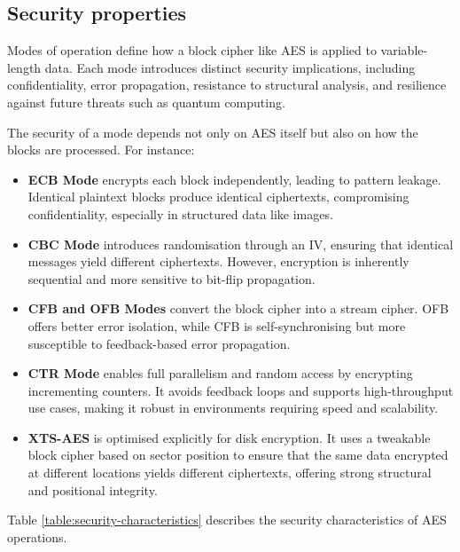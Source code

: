 \subsection{Security properties}

Modes of operation define how a block cipher like AES is applied to variable-length data. 
Each mode introduces distinct security implications, 
including confidentiality, error propagation, resistance to structural analysis, 
and resilience against future threats such as quantum computing.

The security of a mode depends not only on AES itself but also on how the blocks are processed. 
For instance:

\begin{itemize}
    \item \textbf{\Gls{ECB} Mode} encrypts each block independently, leading to pattern leakage. 
    Identical plaintext blocks produce identical ciphertexts, compromising confidentiality, especially in structured data like images.
    
    \item \textbf{\Gls{CBC} Mode} introduces randomisation through an \Gls{IV}, ensuring that identical messages yield different ciphertexts. 
    However, encryption is inherently sequential and more sensitive to bit-flip propagation.
    
    \item \textbf{\Gls{CFB} and \Gls{OFB} Modes} convert the block cipher into a stream cipher. 
    \Gls{OFB} offers better error isolation, while \gls{CFB} is self-synchronising but more susceptible to feedback-based error propagation.
    
    \item \textbf{\Gls{CTR} Mode} enables full parallelism and random access by encrypting incrementing counters. 
    It avoids feedback loops and supports high-throughput use cases, making it robust in environments requiring speed and scalability.
    
    \item \textbf{\Gls{XTS}-AES} is optimised explicitly for disk encryption. 
    It uses a tweakable block cipher based on sector position to ensure that the same data encrypted at different locations yields different ciphertexts, offering strong structural and positional integrity.
\end{itemize}

Table \ref{table:security-characteristics} describes the security characteristics of \gls{AES} operations.

